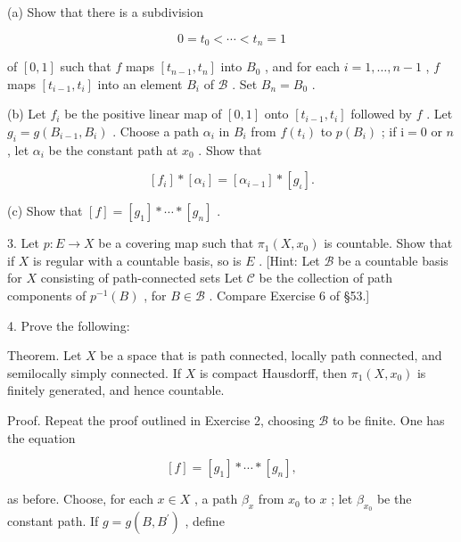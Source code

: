 (a) Show that there is a subdivision

\[
0 = {t}_{0} < \cdots  < {t}_{n} = 1
\]

of \(\left\lbrack  {0,1}\right\rbrack\) such that \(f\) maps \(\left\lbrack  {{t}_{n - 1},{t}_{n}}\right\rbrack\) into \({B}_{0}\) , and for each \(i = 1,\ldots ,n - 1\) , \(f\) maps \(\left\lbrack  {{t}_{i - 1},{t}_{i}}\right\rbrack\) into an element \({B}_{i}\) of \(\mathcal{B}\) . Set \({B}_{n} = {B}_{0}\) .

(b) Let \({f}_{i}\) be the positive linear map of \(\left\lbrack  {0,1}\right\rbrack\) onto \(\left\lbrack  {{t}_{i - 1},{t}_{i}}\right\rbrack\) followed by \(f\) . Let \({g}_{i} = g\left( {{B}_{i - 1},{B}_{i}}\right)\) . Choose a path \({\alpha }_{i}\) in \({B}_{i}\) from \(f\left( {t}_{i}\right)\) to \(p\left( {B}_{i}\right)\) ; if \(\mathrm{i} = 0\) or \(n\) , let \({\alpha }_{i}\) be the constant path at \({x}_{0}\) . Show that

\[
\left\lbrack  {f}_{i}\right\rbrack   * \left\lbrack  {\alpha }_{i}\right\rbrack   = \left\lbrack  {\alpha }_{i - 1}\right\rbrack   * \left\lbrack  {g}_{\iota }\right\rbrack  .
\]

(c) Show that \(\left\lbrack  f\right\rbrack   = \left\lbrack  {g}_{1}\right\rbrack   * \cdots  * \left\lbrack  {g}_{n}\right\rbrack\) .

3. Let \(p : E \rightarrow  X\) be a covering map such that \({\pi }_{1}\left( {X,{x}_{0}}\right)\) is countable. Show that if \(X\) is regular with a countable basis, so is \(E\) . [Hint: Let \(\mathcal{B}\) be a countable basis for \(X\) consisting of path-connected sets Let \(\mathcal{C}\) be the collection of path components of \({p}^{-1}\left( B\right)\) , for \(B \in  \mathcal{B}\) . Compare Exercise 6 of  \S 53.]

4. Prove the following:

Theorem. Let \(X\) be a space that is path connected, locally path connected, and semilocally simply connected. If \(X\) is compact Hausdorff, then \({\pi }_{1}\left( {X,{x}_{0}}\right)\) is finitely generated, and hence countable.

Proof. Repeat the proof outlined in Exercise 2, choosing \(\mathcal{B}\) to be finite. One has the equation

\[
\left\lbrack  f\right\rbrack   = \left\lbrack  {g}_{1}\right\rbrack   * \cdots  * \left\lbrack  {g}_{n}\right\rbrack  ,
\]

as before. Choose, for each \(x \in  X\) , a path \({\beta }_{x}\) from \({x}_{0}\) to \(x\) ; let \({\beta }_{{x}_{0}}\) be the constant path. If \(g = g\left( {B,{B}^{\prime }}\right)\) , define

